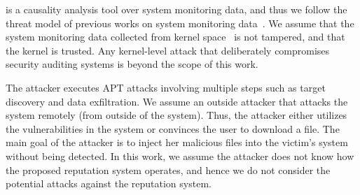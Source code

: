 \tool is a causality analysis tool over system monitoring data,
and thus we follow the threat model of previous works on system monitoring data~\cite{backtracking,backtracking2,loggc,trustkernel,gao2018aiql,gao2018saql,timelytrack}. 
We assume that the system monitoring data collected from kernel space~\cite{auditd,etw} is not tampered, and that the kernel is trusted.
Any kernel-level attack that deliberately compromises security auditing systems is beyond the scope of this work.

The attacker executes APT attacks involving multiple steps such as target discovery and data exfiltration. We assume an outside attacker that attacks the system remotely (from outside of the system). Thus, the attacker either utilizes the vulnerabilities in the system or convinces the user to download a file. The main goal of the attacker is to inject her malicious files into the victim’s system without being detected. In this work, we assume the attacker does not know how the proposed reputation system operates, and hence we do not consider the potential attacks against the reputation system. 

